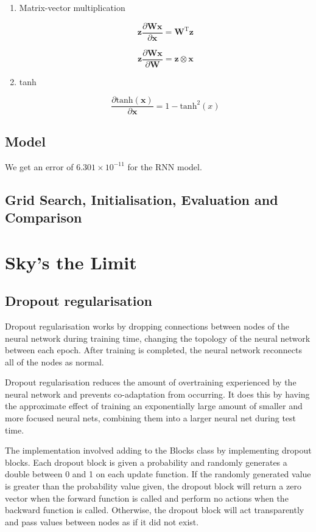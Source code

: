 \documentclass{article} %
\begin{document}
\begin{enumerate}

\item Matrix-vector multiplication

\[\mathbf{z} \frac{\partial \mathbf{W} \mathbf{x}}{\partial \mathbf{x}}  = \mathbf{W}^{\text{T}} \mathbf{z}\]

\[\mathbf{z} \frac{\partial \mathbf{W} \mathbf{x}}{\partial \mathbf{W}}  = \mathbf{z} \otimes \mathbf{x}\]

\item tanh

\[ \frac{\partial \text{tanh}(\mathbf{x})}{\partial \mathbf{x}} = 1 - \text{tanh}^2(x) \]

\end{enumerate}

\subsection{Model}

We get an error of $6.301 \times 10^{-11}$ for the RNN model.

\subsection{Grid Search, Initialisation, Evaluation and Comparison}

\section{Sky's the Limit}

\subsection{Dropout regularisation}

Dropout regularisation works by dropping connections between nodes of the neural network during training time, changing the topology of the neural network between each epoch. After training is completed, the neural network reconnects all of the nodes as normal.

Dropout regularisation reduces the amount of overtraining experienced by the neural network and prevents co-adaptation  from occurring. It does this by having the approximate effect of training an exponentially large amount of smaller and more focused neural nets, combining them into a larger neural net during test time.

The implementation involved adding to the Blocks class by implementing dropout blocks. Each dropout block is given a probability and randomly generates a double between 0 and 1 on each update function. If the randomly generated value is greater than the probability value given, the dropout block will return a zero vector when the forward function is called and perform no actions when the backward function is called. Otherwise, the dropout block will act transparently and pass values between nodes as if it did not exist.
\end{document}
